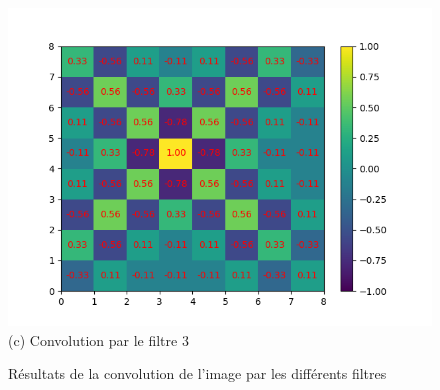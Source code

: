 \begin{figure}[h]
        \includegraphics[width=\textwidth]{img/cnn_exemple/cross/convolution_filtre_3.png}
        \center
        (c) Convolution par le filtre 3
    \endminipage
    \center 
    \caption{Résultats de la convolution de l'image par les différents filtres}
    \label{fig:convolution_filtre}
\end{figure}

